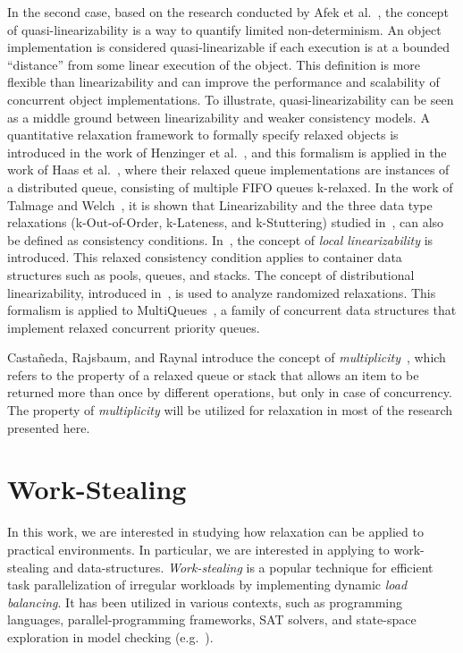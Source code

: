 In the second case, based on the research conducted by Afek et al.~\cite{DBLP_conf_opodis_AfekKY10}, the concept of quasi-linearizability is a way to quantify limited non-determinism. An object implementation is considered quasi-linearizable if each execution is at a bounded ``distance'' from some linear execution of the object. This definition is more flexible than linearizability and can improve the performance and scalability of concurrent object implementations. To illustrate, quasi-linearizability can be seen as a middle ground between linearizability and weaker consistency models. A quantitative relaxation framework to formally specify relaxed objects is introduced in the work of Henzinger et al.~\cite{DBLP_conf_popl_HenzingerKPSS13}, and this formalism is applied in the work of Haas et al.~\cite{DBLP_conf_cf_HaasLHPSKS13}, where their relaxed queue implementations are instances of a distributed queue, consisting of multiple FIFO queues k-relaxed. In the work of Talmage and Welch~\cite{DBLP_journals_algorithms_TalmageW18}, it is shown that Linearizability and the three data type relaxations (k-Out-of-Order, k-Lateness, and k-Stuttering) studied in~\cite{DBLP_conf_popl_HenzingerKPSS13},  can also be defined as consistency conditions. In~\cite{DBLP_conf_concur_HaasHHKLPSSV16}, the concept of \textit{local linearizability} is introduced. This relaxed consistency condition applies to container data structures such as pools, queues, and stacks. The concept of distributional linearizability, introduced in~\cite{DBLP_conf_spaa_Alistarh0KLN18}, is used to analyze randomized relaxations. This formalism is applied to MultiQueues~\cite{DBLP_conf_spaa_RihaniSD15}, a family of concurrent data structures that implement relaxed concurrent priority queues.

Castañeda, Rajsbaum, and Raynal introduce the concept of \emph{multiplicity}~\cite{DBLP_conf_opodis_CastanedaRR20}, which refers to the property of a relaxed queue or stack that allows an item to be returned more than once by different operations, but only in case of concurrency. The property of \emph{multiplicity} will be utilized for relaxation in most of the research presented here.

\section{\label{section:work-stealing}Work-Stealing}

In this work, we are interested in studying how relaxation can be applied to practical environments. In particular, we are interested in applying to work-stealing and data-structures. \emph{Work-stealing} is a popular technique for efficient task parallelization of irregular workloads by implementing dynamic \emph{load balancing}. It has been utilized in various contexts, such as programming languages, parallel-programming frameworks, SAT solvers, and state-space exploration in model checking (e.g.~\cite{DBLP_journals_tpds_AyguadeCDHLMTUZ09,
  DBLP_journals_jpdc_BlumofeJKLRZ96, DBLP_journals_tpds_AyguadeCDHLMTUZ09, DBLP_conf_jvm_FloodDSZ01, DBLP_conf_pldi_FrigoLR98, DBLP_conf_java_Lea00, DBLP_conf_hpca_RangerRPBK07}).

